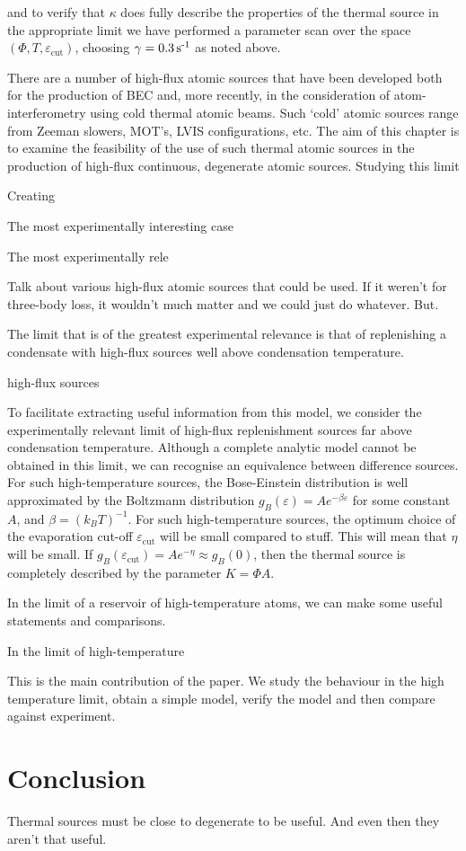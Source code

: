 and to verify that $\kappa$ does fully describe the properties of the thermal source in the appropriate limit we have performed a parameter scan over the space $(\Phi, T, \varepsilon_\text{cut})$, choosing $\gamma = \unit[0.3]{s\textsuperscript{-1}}$ as noted above.



There are a number of high-flux atomic sources that have been developed both for the production of BEC and, more recently, in the consideration of atom-interferometry using cold thermal atomic beams. Such `cold' atomic sources range from Zeeman slowers, MOT's, LVIS configurations, etc. The aim of this chapter is to examine the feasibility of the use of such thermal atomic sources in the production of high-flux continuous, degenerate atomic sources. Studying this limit

Creating

The most experimentally interesting case

The most experimentally rele


Talk about various high-flux atomic sources that could be used. If it weren't for three-body loss, it wouldn't much matter and we could just do whatever. But. 


The limit that is of the greatest experimental relevance is that of replenishing a condensate with high-flux sources well above condensation temperature.

high-flux sources


To facilitate extracting useful information from this model, we consider the experimentally relevant limit of high-flux replenishment sources far above condensation temperature. Although a complete analytic model cannot be obtained in this limit, we can recognise an equivalence between difference sources. For such high-temperature sources, the Bose-Einstein distribution is well approximated by the Boltzmann distribution $g_B(\varepsilon) = A e^{-\beta\varepsilon}$ for some constant $A$, and $\beta = \left(k_B T\right)^{-1}$. For such high-temperature sources, the optimum choice of the evaporation cut-off $\varepsilon_\text{cut}$ will be small compared to stuff. This will mean that $\eta$ will be small. If $g_B(\varepsilon_\text{cut}) = A e^{-\eta} \approx g_B(0)$, then the thermal source is completely described by the parameter $K=\Phi A$.




In the limit of a reservoir of high-temperature atoms, we can make some useful statements and comparisons.


In the limit of high-temperature 


This is the main contribution of the paper. We study the behaviour in the high temperature limit, obtain a simple model, verify the model and then compare against experiment.




\section{Conclusion}
Thermal sources must be close to degenerate to be useful. And even then they aren't that useful.